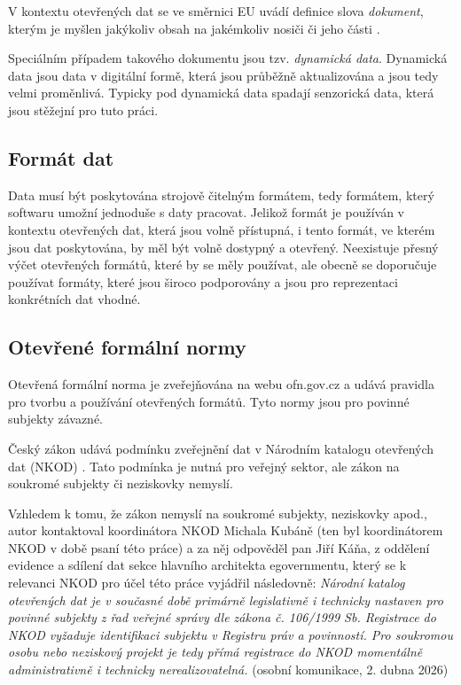 V kontextu otevřených dat se ve směrnici EU uvádí definice slova \textit{dokument}, kterým je myšlen jakýkoliv obsah na jakémkoliv nosiči či jeho části \parencite[čl. 2 odst. 6]{SmerniceEvropskehoParlamentu2019}. 

Speciálním případem takového dokumentu jsou tzv. \textit{dynamická data}. Dynamická data jsou data v digitální formě, která jsou průběžně aktualizována a jsou tedy velmi proměnlivá. Typicky pod dynamická data spadají senzorická data, která jsou stěžejní pro tuto práci. \parencite[čl. 2 odst. 8]{SmerniceEvropskehoParlamentu2019}

\FloatBarrier
\subsection{Formát dat}
Data musí být poskytována strojově čitelným formátem, tedy formátem, který softwaru umožní jednoduše s daty pracovat. \parencite[čl. 2 odst. 13]{SmerniceEvropskehoParlamentu2019}
Jelikož formát je používán v kontextu otevřených dat, která jsou volně přístupná, i tento formát, ve kterém jsou dat poskytována, by měl být volně dostypný a otevřený. \parencite[čl. 2 odst. 14]{SmerniceEvropskehoParlamentu2019} Neexistuje přesný výčet otevřených formátů, které by se měly používat, ale obecně se doporučuje používat formáty, které jsou široco podporovány a jsou pro reprezentaci konkrétních dat vhodné.

\FloatBarrier
\subsection{Otevřené formální normy}
Otevřená formální norma je zveřejňována na webu ofn.gov.cz a udává pravidla pro tvorbu a používání otevřených formátů. Tyto normy jsou pro povinné subjekty závazné. \parencite{OtevreneFormalniNormy}

Český zákon udává podmínku zveřejnění dat v Národním katalogu otevřených dat (NKOD) \parencite[§ 4c odst. 1]{Zakon1061999}. Tato podmínka je nutná pro veřejný sektor, ale zákon na soukromé subjekty či neziskovky nemyslí.

Vzhledem k tomu, že zákon nemyslí na soukromé subjekty, neziskovky apod., autor kontaktoval koordinátora NKOD Michala Kubáně (ten byl koordinátorem NKOD v době psaní této práce) a za něj odpověděl pan Jiří Káňa, z oddělení evidence a sdílení dat sekce hlavního architekta egovernmentu, který se k relevanci NKOD pro účel této práce vyjádřil následovně: \textit{Národní katalog otevřených dat je v současné době primárně legislativně i technicky nastaven pro povinné subjekty z řad veřejné správy dle zákona č. 106/1999 Sb. Registrace do NKOD vyžaduje identifikaci subjektu v Registru práv a povinností. Pro soukromou osobu nebo neziskový projekt je tedy přímá registrace do NKOD momentálně administrativně i technicky nerealizovatelná.} (osobní komunikace, 2. dubna 2026)

